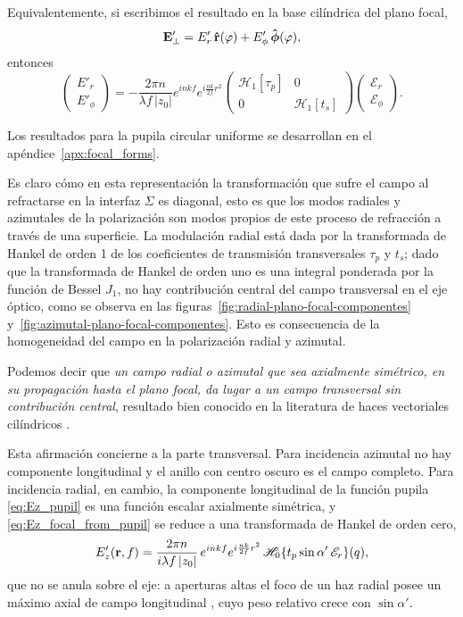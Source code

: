 Equivalentemente, si escribimos el resultado en la base cilíndrica del plano focal,
\begin{equation}
  \vb E'_\perp
  =
  E'_r\,\bm{\hat{\mathbf{r}}}(\varphi)
  +
  E'_\phi\,\bm{\hat{\mathbf{\phi}}}(\varphi),
\end{equation}
entonces
\begin{equation}
\boxed{
\begin{pmatrix}
E'_r\\
E'_\phi
\end{pmatrix}
=
-\frac{2\pi n}{\lambda f\,|z_0|}
e^{inkf}
e^{i\frac{nk}{2f}r^2}
\begin{pmatrix}
\mathscr H_1[\tau_p] & 0\\
0 & \mathscr H_1[t_s]
\end{pmatrix}
\begin{pmatrix}
\mathscr E_r\\
\mathscr E_\phi
\end{pmatrix}.
}
\label{eq:E_cylindrical_Hankel_matrix}
\end{equation}

Los resultados para la pupila circular uniforme se desarrollan en el apéndice~\ref{apx:focal_forms}.

Es claro cómo en esta representación la transformación que sufre el campo al refractarse en la interfaz $\Sigma$ es diagonal, esto es que los modos radiales y azimutales de la polarización son modos propios de este proceso de refracción a través de una superficie. La modulación radial está dada por la transformada de Hankel de orden 1 de los coeficientes de transmisión transversales $\tau_p$ y $t_s$; dado que la transformada de Hankel de orden uno es una integral ponderada por la función de Bessel $J_1$, no hay contribución central del campo transversal en el eje óptico, como se observa en las figuras~\ref{fig:radial-plano-focal-componentes} y~\ref{fig:azimutal-plano-focal-componentes}. Esto es consecuencia de la homogeneidad del campo en la polarización radial y azimutal.

Podemos decir que \textit{un campo radial o azimutal que sea axialmente simétrico, en su propagación hasta el plano focal, da lugar a un campo transversal sin contribución central}, resultado bien conocido en la literatura de haces vectoriales cilíndricos \cite{Youngworth2000, Zhan2009}.

Esta afirmación concierne a la parte transversal. Para incidencia azimutal no hay componente longitudinal y el anillo con centro oscuro es el campo completo. Para incidencia radial, en cambio, la componente longitudinal de la función pupila \eqref{eq:Ez_pupil} es una función escalar axialmente simétrica, y \eqref{eq:Ez_focal_from_pupil} se reduce a una transformada de Hankel de orden cero,
\begin{equation}
  E'_z(\vb r, f)
  =
  \frac{2\pi n}{i\lambda f\,|z_0|}\,e^{inkf}e^{i\frac{nk}{2f}r^2}\,
  \mathscr H_0\{t_p\sin\alpha'\,\mathscr E_r\}(q),
  \label{eq:Ez_focal_radial}
\end{equation}
que no se anula sobre el eje: a aperturas altas el foco de un haz radial posee un máximo axial de campo longitudinal \cite{Youngworth2000, Zhan2009}, cuyo peso relativo crece con $\sin\alpha'$.

